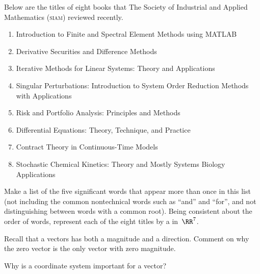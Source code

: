 \begin{exercise} \label{ex:8siambks} 
Below are the titles of eight books that The Society of Industrial and Applied Mathematics (\textsc{siam}) reviewed recently.
\begin{enumerate}
\item Introduction to Finite and Spectral Element Methods using MATLAB
\item Derivative Securities and Difference Methods 
\item Iterative Methods for Linear Systems: Theory and Applications 
\item Singular Perturbations: Introduction to System Order Reduction Methods with Applications 
\item Risk and Portfolio Analysis: Principles and Methods 
\item Differential Equations: Theory, Technique, and Practice 
\item Contract Theory in Continuous-Time Models 
\item Stochastic Chemical Kinetics: Theory and Mostly Systems Biology Applications
\end{enumerate}
Make a list of the five significant words that appear more than once in this list (not including the common nontechnical words such as ``and'' and ``for'', and not distinguishing between words with a common root).
Being consistent about the order of words, represent each of the eight titles by a  in~\(\RR^7\).

\end{exercise}





\begin{exercise} \label{ex:} 
Recall that a vectors has both a magnitude and a direction.  
Comment on why the zero vector is the only vector with zero magnitude.
\end{exercise}



\begin{exercise} \label{ex:} 
Why is a coordinate system important for a vector?
\end{exercise}



\begin{comment}%
why, what caused X?
how did X occur?
what-if? what-if-not?
how does X compare with Y?
what is the evidence for X?
why is X important?
\end{comment}





